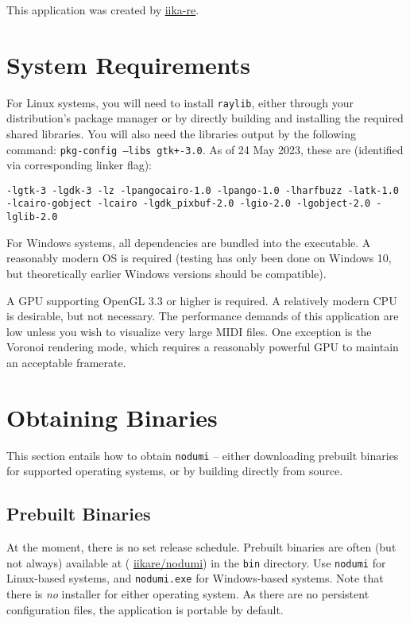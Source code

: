 \documentclass[english]{article}
\makeatletter
\newenvironment{restoretext}%
    {\@parboxrestore%
     \begin{adjustwidth}{}{\leftmargin}%
    }{\end{adjustwidth}
     }
\def\rcbegin{\begin{restoretext}\centering}
\def\rcend{\end{restoretext}}
\providecommand{\mi}[1]{\texttt{#1}}
\makeatother
\begin{document}
This application was created by \textcolor{lcol}{\href{https://iika.re}{iika-re}}.

\section{System Requirements}

For Linux systems, you will need to install \mi{raylib}, either through your distribution's package manager or by directly
building and installing the required shared libraries. You will also need the libraries output by the following command:
\mi{pkg-config --libs gtk+-3.0}. As of 24 May 2023, these are (identified via corresponding linker flag): 

\vspace{1em}

\rcbegin
  \mi{-lgtk-3 -lgdk-3 -lz -lpangocairo-1.0 -lpango-1.0 -lharfbuzz -latk-1.0
      -lcairo-gobject -lcairo -lgdk_pixbuf-2.0 -lgio-2.0 -lgobject-2.0 -lglib-2.0}
\rcend

\vspace{1em}

For Windows systems, all dependencies are bundled into the executable. A reasonably modern OS is required (testing has
only been done on Windows 10, but theoretically earlier Windows versions should be compatible).

A GPU supporting OpenGL 3.3 or higher is required. A relatively modern CPU is desirable, but not necessary.
The performance demands of this application are low unless you wish to visualize very large MIDI files.
One exception is the Voronoi rendering mode, which requires a reasonably powerful GPU to maintain an acceptable framerate.

\section{Obtaining Binaries}
\label{sec:obtain}

This section entails how to obtain \mi{nodumi} -- either downloading prebuilt binaries for supported operating systems,
or by building directly from source.

\subsection{Prebuilt Binaries}

At the moment, there is no set release schedule. Prebuilt binaries are often (but not always) available at 
\textcolor{lcol}{(\raisebox{-0.1\height}{\faGithub} \href{https://github.com/iikare/nodumi}{iikare/nodumi})}
in the \mi{bin} directory. Use \mi{nodumi} for Linux-based systems, and \mi{nodumi.exe} for Windows-based systems.
Note that there is \textit{no} installer for either operating system. As there are no persistent configuration files,
the application is portable by default.
\end{document}
